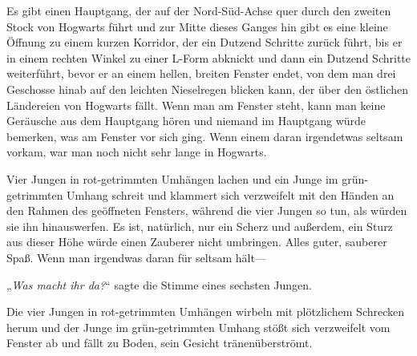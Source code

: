 Es gibt einen Hauptgang, der auf der Nord-Süd-Achse quer durch den zweiten Stock von Hogwarts führt und zur Mitte dieses Ganges hin gibt es eine kleine Öffnung zu einem kurzen Korridor, der ein Dutzend Schritte zurück führt, bis er in einem rechten Winkel zu einer L-Form abknickt und dann ein Dutzend Schritte weiterführt, bevor er an einem hellen, breiten Fenster endet, von dem man drei Geschosse hinab auf den leichten Nieselregen blicken kann, der über den östlichen Ländereien von Hogwarts fällt. Wenn man am Fenster steht, kann man keine Geräusche aus dem Hauptgang hören und niemand im Hauptgang würde bemerken, was am Fenster vor sich ging. Wenn einem daran irgendetwas seltsam vorkam, war man noch nicht sehr lange in Hogwarts.

Vier Jungen in rot-getrimmten Umhängen lachen und ein Junge im grün-getrimmten Umhang schreit und klammert sich verzweifelt mit den Händen an den Rahmen des geöffneten Fensters, während die vier Jungen so tun, als würden sie ihn hinauswerfen. Es ist, natürlich, nur ein Scherz und außerdem, ein Sturz aus dieser Höhe würde einen Zauberer nicht umbringen. Alles guter, sauberer Spaß. Wenn man irgendwas daran für seltsam hält—

„\emph{Was macht ihr da?}“ sagte die Stimme eines sechsten Jungen.

Die vier Jungen in rot-getrimmten Umhängen wirbeln mit plötzlichem Schrecken herum und der Junge im grün-getrimmten Umhang stößt sich verzweifelt vom Fenster ab und fällt zu Boden, sein Gesicht tränenüberströmt.

